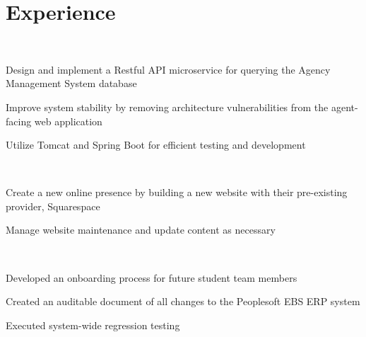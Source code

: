 \documentclass[]{hieudo-build}
\begin{document}
\begin{minipage}[t]{0.65\textwidth} 

\section{Experience}

\\
\vspace{0.9em} %
\begin{tightemize}
\item Design and implement a Restful API microservice for querying the Agency Management System database
\item Improve system stability by removing architecture vulnerabilities from the agent-facing web application
\item Utilize Tomcat and Spring Boot for efficient testing and development
\end{tightemize}
\sectionsep

 \\
\begin{tightemize}
\item Create a new online presence by building a new website with their pre-existing provider, Squarespace
\item Manage website maintenance and update content as necessary
\end{tightemize}
\sectionsep

 \\
\begin{tightemize}
\item Developed an onboarding process for future student team members
\item Created an auditable document of all changes to the Peoplesoft EBS ERP system
\item Executed system-wide regression testing
\end{tightemize}
\sectionsep


\end{minipage}
\end{document}
